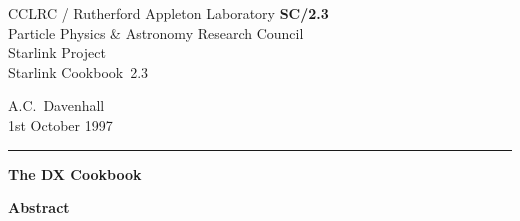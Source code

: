 \documentclass[twoside,11pt]{article}
\newcommand{\stardoccategory}  {Starlink Cookbook}
\newcommand{\stardocinitials}  {SC}
\newcommand{\stardocnumber}    {2.3}
\newcommand{\stardocauthors}   {A.C.~Davenhall}
\newcommand{\stardocdate}      {1st October 1997}
\newcommand{\stardoctitle}     {The DX Cookbook}
\newcommand{\stardocname}{\stardocinitials /\stardocnumber}
\newenvironment{latexonly}{}{}
\begin{document}
\thispagestyle{empty}

\begin{latexonly}
   CCLRC / {\sc Rutherford Appleton Laboratory} \hfill {\bf \stardocname}\\
   {\large Particle Physics \& Astronomy Research Council}\\
   {\large Starlink Project\\}
   {\large \stardoccategory\ \stardocnumber}
   \begin{flushright}
   \stardocauthors\\
   \stardocdate
   \end{flushright}
   \vspace{-4mm}
   \rule{\textwidth}{0.5mm}
   \vspace{5mm}
   \begin{center}
   {\Huge\bf  \stardoctitle \\ [2.5ex]}
   \end{center}
   \vspace{5mm}

   \vspace{10mm}
   \begin{center}
      {\Large\bf Abstract}
   \end{center}
\end{latexonly}
\end{document}
